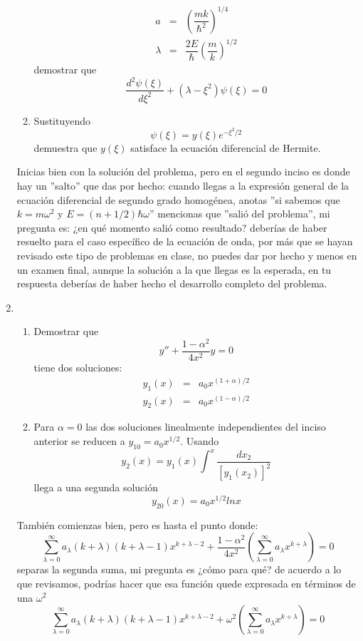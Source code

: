 \begin{enumerate}
\begin{enumerate}
\begin{eqnarray*}
a &=& \left( \dfrac{m k}{\hbar^{2}} \right)^{1/4}  \\ \nonumber
\lambda &=& \dfrac{2E}{\hbar} \left(\dfrac{m}{k} \right)^{1/2} \nonumber
\end{eqnarray*}
demostrar que
\[ \dfrac{d^{2} \psi(\xi)}{d \xi^{2}} + (\lambda - \xi^{2}) \psi(\xi) = 0 \]
\item Sustituyendo
\[ \psi(\xi) = y(\xi) e^{-\xi^{2}/2}\]
demuestra que $y(\xi)$ satisface la ecuación diferencial de Hermite.
\end{enumerate}
Inicias bien con la solución del problema, pero en el segundo inciso es donde hay un ''salto'' que das por hecho: cuando llegas a la expresión general de la ecuación diferencial de segundo grado homogénea, anotas ''si sabemos que $k=m\omega^{2}$ y $E=(n +1/2) \hbar \omega$'' mencionas que ''salió del problema'', mi pregunta es: ¿en qué momento salió como resultado? deberías de haber resuelto para el caso específico de la ecuación de onda, por más que se hayan revisado este tipo de problemas en clase, no puedes dar por hecho y menos en un examen final, aunque la solución a la que llegas es la esperada, en tu respuesta deberías de haber hecho el desarrollo completo del problema.
\item 
\begin{enumerate}
\item Demostrar que
\[  y'' + \dfrac{1 - \alpha^{2}}{4 x^{2}} y = 0\]
tiene dos soluciones:
\begin{eqnarray*}
y_{1}(x) &=& a_{0} x^{(1+\alpha)/2} \\
y_{2}(x) &=& a_{0} x^{(1-\alpha)/2}
\end{eqnarray*}
\item Para $\alpha =0$ las dos soluciones linealmente independientes del inciso anterior se reducen a $y_{10} = a_{0} x^{1/2}$. Usando
\[ y_{2}(x) =  y_{1}(x) \int^{x} \dfrac{dx_{2}}{[y_{1}(x_{2})]^{2}}\]
llega a una segunda solución
\[ y_{20}(x) = a_{0} x^{1/2} ln x \]
\end{enumerate}
También comienzas bien, pero es hasta el punto donde:
\[ \sum_{\lambda=0}^{\infty} a_{\lambda} (k + \lambda)(k+\lambda-1) x^{k+\lambda-2} + \dfrac{1-\alpha^{2}}{4x^{2}} \left( \sum_{\lambda=0}^{\infty} a_{\lambda} x^{k+\lambda} \right) = 0 \]
separas la segunda suma, mi pregunta es ¿cómo para qué? de acuerdo a lo que revisamos, podrías hacer que esa función quede expresada en términos de una $\omega^{2}$
\[ \sum_{\lambda=0}^{\infty} a_{\lambda} (k + \lambda)(k+\lambda-1) x^{k+\lambda-2} + \omega^{2} \left( \sum_{\lambda=0}^{\infty} a_{\lambda} x^{k+\lambda} \right) = 0 \]

\end{enumerate}
